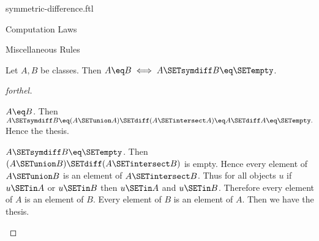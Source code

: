 \documentclass{stex}
\begin{document}
\begin{smodule}{symmetric-difference.ftl}
\begin{sfragment}{Computation Laws}
\begin{sfragment}{Miscellaneous Rules}
    \begin{proposition}[forthel,id=FOUNDATIONS_03_6111806917443584]
      Let $A, B$ be classes.
      Then $A \eq B \iff A \SETsymdiff B \eq \SETempty$.
    \end{proposition}
    \begin{proof}[forthel]
      \begin{case}{$A \eq B$.}
        Then $A \SETsymdiff B
          \eq (A \SETunion A) \SETdiff (A \SETintersect A)
          \eq A \SETdiff A
          \eq \SETempty.$
        Hence the thesis.
      \end{case}

      \begin{case}{$A \SETsymdiff B \eq \SETempty$.}
        Then $(A \SETunion B) \SETdiff (A \SETintersect B)$ is empty.
        Hence every element of $A \SETunion B$ is an element of $A \SETintersect B$.
        Thus for all objects $u$ if $u \SETin A$ or $u \SETin B$ then $u \SETin A$ and $u \SETin B$.
        Therefore every element of $A$ is an element of $B$.
        Every element of $B$ is an element of $A$.
        Then we have the thesis.
      \end{case}
    \end{proof}
  \end{sfragment}
\end{sfragment}
\end{smodule}
\end{document}

